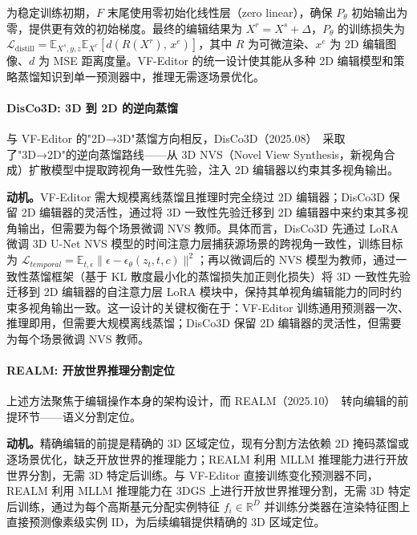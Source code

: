 为稳定训练初期，$F$ 末尾使用零初始化线性层（zero linear），确保 $P_\theta$ 初始输出为零，提供更有效的初始梯度。最终的编辑结果为 $X^r = X^s + \Delta$，$P_\theta$ 的训练损失为 $\mathcal{L}_{\text{distill}} = \mathbb{E}_{X^s, y, z}\mathbb{E}_{X^r}\left[d\left(R(X^r),\, x^e\right)\right]$，其中 $R$ 为可微渲染、$x^e$ 为 2D 编辑图像、$d$ 为 MSE 距离度量。VF-Editor 的统一设计使其能从多种 2D 编辑模型和策略蒸馏知识到单一预测器中，推理无需逐场景优化。

\paragraph{DisCo3D: 3D 到 2D 的逆向蒸馏}

与 VF-Editor 的"2D→3D"蒸馏方向相反，DisCo3D（2025.08）~\cite{2508_01684}采取了"3D→2D"的逆向蒸馏路线——从 3D NVS（Novel View Synthesis，新视角合成）扩散模型中提取跨视角一致性先验，注入 2D 编辑器以约束其多视角输出。

\textbf{动机。}VF-Editor 需大规模离线蒸馏且推理时完全绕过 2D 编辑器；DisCo3D 保留 2D 编辑器的灵活性，通过将 3D 一致性先验迁移到 2D 编辑器中来约束其多视角输出，但需要为每个场景微调 NVS 教师。具体而言，DisCo3D 先通过 LoRA 微调 3D U-Net NVS 模型的时间注意力层捕获源场景的跨视角一致性，训练目标为 $\mathcal{L}_{temporal} = \mathbb{E}_{t,\epsilon}\|\epsilon - \epsilon_\theta(z_t,t,c)\|^2$；再以微调后的 NVS 模型为教师，通过一致性蒸馏框架（基于 KL 散度最小化的蒸馏损失加正则化损失）将 3D 一致性先验迁移到 2D 编辑器的自注意力层 LoRA 模块中，保持其单视角编辑能力的同时约束多视角输出一致。这一设计的关键权衡在于：VF-Editor 训练通用预测器一次、推理即用，但需要大规模离线蒸馏；DisCo3D 保留 2D 编辑器的灵活性，但需要为每个场景微调 NVS 教师。

\paragraph{REALM: 开放世界推理分割定位}

上述方法聚焦于编辑操作本身的架构设计，而 REALM（2025.10）~\cite{2510_16410}转向编辑的前提环节——语义分割定位。

\textbf{动机。}精确编辑的前提是精确的 3D 区域定位，现有分割方法依赖 2D 掩码蒸馏或逐场景优化，缺乏开放世界的推理能力；REALM 利用 MLLM 推理能力进行开放世界分割，无需 3D 特定后训练。与 VF-Editor 直接训练变化预测器不同，REALM 利用 MLLM 推理能力在 3DGS 上进行开放世界推理分割，无需 3D 特定后训练，通过为每个高斯基元分配实例特征 $f_i \in \mathbb{R}^D$ 并训练分类器在渲染特征图上直接预测像素级实例 ID，为后续编辑提供精确的 3D 区域定位。


